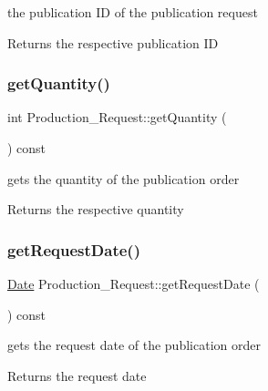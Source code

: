 the publication ID of the publication request 

\begin{DoxyReturn}{Returns}
the respective publication ID 
\end{DoxyReturn}
\mbox{\label{class_production___request_aac38238db2c32af73c839314c3e254a6}} 
\subsubsection{\texorpdfstring{get\+Quantity()}{getQuantity()}}
{\footnotesize\ttfamily int Production\+\_\+\+Request\+::get\+Quantity (\begin{DoxyParamCaption}{ }\end{DoxyParamCaption}) const}



gets the quantity of the publication order 

\begin{DoxyReturn}{Returns}
the respective quantity 
\end{DoxyReturn}
\mbox{\label{class_production___request_aed0efd10e677d4bca14d00b5f981718a}} 
\subsubsection{\texorpdfstring{get\+Request\+Date()}{getRequestDate()}}
{\footnotesize\ttfamily \hyperlink{class_date}{Date} Production\+\_\+\+Request\+::get\+Request\+Date (\begin{DoxyParamCaption}{ }\end{DoxyParamCaption}) const}



gets the request date of the publication order 

\begin{DoxyReturn}{Returns}
the request date 
\end{DoxyReturn}
\mbox{\label{class_production___request_acf3db397822496809bde807696518e95}} 
